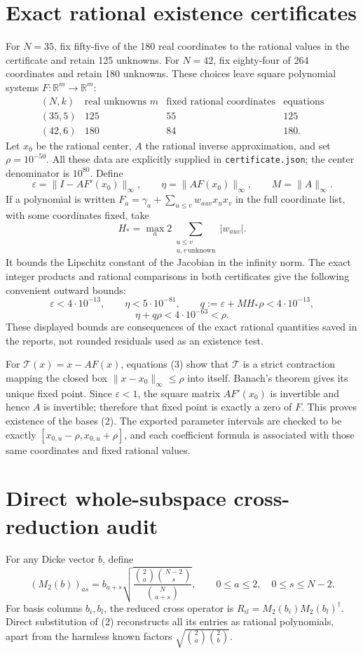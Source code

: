\documentclass[11pt]{article}
\begin{document}
\section{Exact rational existence certificates}
For $N=35$, fix fifty-five of the 180 real coordinates to the rational
values in the certificate and retain 125 unknowns. For $N=42$, fix
eighty-four of 264 coordinates and retain 180 unknowns. These choices
leave square polynomial systems $F:\mathbb R^m\to\mathbb R^m$:
\[
\begin{array}{c|ccc}
(N,k)&\text{real unknowns }m&\text{fixed rational coordinates}&\text{equations}\\\hline
(35,5)&125&55&125\\
(42,6)&180&84&180.
\end{array}
\]
Let $x_0$ be the rational center, $A$ the rational inverse approximation,
and set $\rho=10^{-50}$. All these data are explicitly supplied in
\texttt{certificate.json}; the center denominator is $10^{80}$.
Define
\[
 \varepsilon=\|I-AF'(x_0)\|_\infty,\qquad
 \eta=\|AF(x_0)\|_\infty,\qquad
 M=\|A\|_\infty.
\]
If a polynomial is written $F_a=\gamma_a+\sum_{u\le v}w_{auv}x_ux_v$
in the full coordinate list, with some coordinates fixed, take
\[
 H_*=\max_a 2\!\sum_{\substack{u\le v\\u,v\ \mathrm{unknown}}}|w_{auv}|.
\]
It bounds the Lipschitz constant of the Jacobian in the infinity norm.
The exact integer products and rational comparisons in both certificates
give the following convenient outward bounds:
\[
 \varepsilon<4\cdot10^{-13},\qquad
 \eta<5\cdot10^{-81},\qquad
 q:=\varepsilon+MH_*\rho<4\cdot10^{-13},
\]
\[
 \eta+q\rho<4\cdot10^{-63}<\rho.
 \tag{3}
\]
These displayed bounds are consequences of the exact rational quantities
saved in the reports, not rounded residuals used as an existence test.

For $\mathcal T(x)=x-AF(x)$, equations (3) show that $\mathcal T$ is a
strict contraction mapping the closed box
$\|x-x_0\|_\infty\le\rho$ into itself. Banach's theorem gives its unique
fixed point. Since $\varepsilon<1$, the square matrix $AF'(x_0)$ is
invertible and hence $A$ is invertible; therefore that fixed point is
exactly a zero of $F$. This proves existence of the bases (2).
The exported parameter intervals are checked to be exactly
$[x_{0,u}-\rho,x_{0,u}+\rho]$, and each coefficient formula is associated
with those same coordinates and fixed rational values.

\section{Direct whole-subspace cross-reduction audit}
For any Dicke vector $b$, define
\[
 (M_2(b))_{as}=b_{a+s}
 \sqrt{\frac{\binom2a\binom{N-2}s}{\binom N{a+s}}},
 \qquad0\le a\le2,\quad0\le s\le N-2.
\]
For basis columns $b_i,b_l$, the reduced cross operator is
$R_{il}=M_2(b_i)M_2(b_l)^\dagger$. Direct substitution of (2) reconstructs
all its entries as rational polynomials, apart from the harmless known
factors $\sqrt{\binom2a\binom2b}$.
\end{document}
